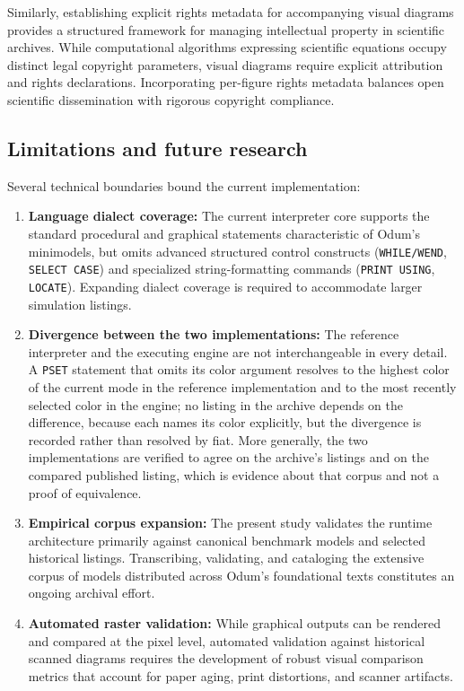 \documentclass[3p,times,authoryear,twocolumn]{elsarticle}
\begin{document}
Similarly, establishing explicit rights metadata for accompanying visual diagrams provides a structured framework for managing intellectual property in scientific archives. While computational algorithms expressing scientific equations occupy distinct legal copyright parameters, visual diagrams require explicit attribution and rights declarations. Incorporating per-figure rights metadata balances open scientific dissemination with rigorous copyright compliance.

\subsection{Limitations and future research}

Several technical boundaries bound the current implementation:
\begin{enumerate}
\item \textbf{Language dialect coverage:} The current interpreter core supports the standard procedural and graphical statements characteristic of Odum's minimodels, but omits advanced structured control constructs (\texttt{WHILE/WEND}, \texttt{SELECT CASE}) and specialized string-formatting commands (\texttt{PRINT USING}, \texttt{LOCATE}). Expanding dialect coverage is required to accommodate larger simulation listings.
\item \textbf{Divergence between the two implementations:} The reference interpreter and the executing engine are not interchangeable in every detail. A \texttt{PSET} statement that omits its color argument resolves to the highest color of the current mode in the reference implementation and to the most recently selected color in the engine; no listing in the archive depends on the difference, because each names its color explicitly, but the divergence is recorded rather than resolved by fiat. More generally, the two implementations are verified to agree on the archive's listings and on the compared published listing, which is evidence about that corpus and not a proof of equivalence.
\item \textbf{Empirical corpus expansion:} The present study validates the runtime architecture primarily against canonical benchmark models and selected historical listings. Transcribing, validating, and cataloging the extensive corpus of models distributed across Odum's foundational texts \citep{odum1983,odumMinimodels,odumOdum2000} constitutes an ongoing archival effort.
\item \textbf{Automated raster validation:} While graphical outputs can be rendered and compared at the pixel level, automated validation against historical scanned diagrams requires the development of robust visual comparison metrics that account for paper aging, print distortions, and scanner artifacts.
\end{enumerate}
\end{document}
